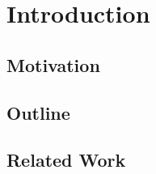 
\chapter{Introduction}\label{chapter:introduction}

\section{Motivation}

\section{Outline}

\section{Related Work}
